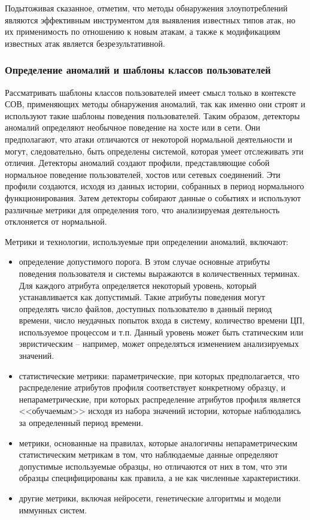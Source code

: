 Подытоживая сказанное, отметим, что методы обнаружения злоупотреблений являются эффективным инструментом для выявления известных типов атак, но их применимость по отношению к новым атакам,
а также к модификациям известных атак является безрезультативной.


\subsubsection{Определение аномалий и шаблоны классов пользователей}

Рассматривать шаблоны классов пользователей имеет смысл только в контексте СОВ,
применяющих методы обнаружения аномалий, так как именно они строят и используют
такие шаблоны поведения пользователей. Таким образом, детекторы аномалий определяют
необычное поведение на хосте или в сети. Они предполагают, что атаки отличаются от
некоторой нормальной деятельности и могут, следовательно, быть определены системой,
которая умеет отслеживать эти отличия. Детекторы аномалий создают профили, представляющие
собой нормальное поведение пользователей, хостов или сетевых соединений. Эти профили
создаются, исходя из данных истории, собранных в период нормального функционирования.
Затем детекторы собирают данные о событиях и используют различные метрики для определения
того, что анализируемая деятельность отклоняется от нормальной.

Метрики и технологии, используемые при определении аномалий, включают:

\begin{itemize}
	\item определение допустимого порога. В этом случае основные атрибуты поведения
	пользователя и системы выражаются в количественных терминах. Для каждого атрибута
	определяется некоторый уровень, который устанавливается как допустимый. Такие атрибуты
	поведения могут определять число файлов, доступных пользователю в данный период времени,
	число неудачных попыток входа в систему, количество времени ЦП, используемое процессом и
	т.п. Данный уровень может быть статическим или эвристическим -- например, может определяться
	изменением анализируемых значений.

	\item статистические метрики: параметрические, при которых предполагается, что распределение
	атрибутов профиля соответствует конкретному образцу, и непараметрические, при которых
	распределение атрибутов профиля является <<обучаемым>> исходя из набора значений истории,
	которые наблюдались за определенный период времени.

	\item метрики, основанные на правилах, которые аналогичны непараметрическим статистическим
	метрикам в том, что наблюдаемые данные определяют допустимые используемые образцы, но
	отличаются от них в том, что эти образцы специфицированы как правила, а не как численные
	характеристики.

	\item другие метрики, включая нейросети, генетические алгоритмы и модели иммунных систем.
\end{itemize}


